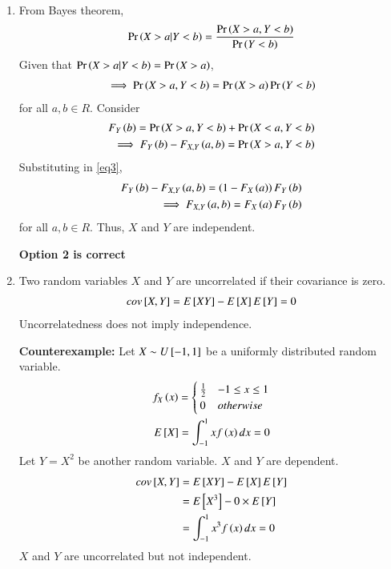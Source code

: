 \documentclass[journal,12pt,twocolumn]{IEEEtran}
\begin{document}
\begin{enumerate}
    \item From Bayes theorem,
    \begin{align}
      \Pr\left(X>a|Y<b\right)=\frac{\Pr\left(X>a,Y<b\right)}{\Pr\left(Y<b\right)}
    \end{align}
    Given that $\Pr\left(X>a|Y<b\right)=\Pr\left(X>a\right)$,
    \begin{align}
        \label{eq3}\implies \Pr\left(X>a,Y<b\right)=\Pr\left(X>a\right)\Pr\left(Y<b\right)
    \end{align}
    for all $a,b\in R$. Consider
    \begin{align}
        F_Y\left(b\right)=\Pr\left(X>a,Y<b\right)+\Pr\left(X<a,Y<b\right)\\
        \implies F_Y\left(b\right)-F_{X,Y}\left(a,b\right)=\Pr\left(X>a,Y<b\right)
    \end{align}
    Substituting in \eqref{eq3},
    \begin{align}
        F_Y\left(b\right)-F_{X,Y}\left(a,b\right)=\left(1-F_X\left(a\right)\right)F_Y\left(b\right)\\
        \implies F_{X,Y}\left(a,b\right)=F_X\left(a\right)F_Y\left(b\right)
    \end{align}
    for all $a,b\in R$. Thus, $X$ and $Y$ are independent. 
    
    \textbf{Option 2 is correct}
    
    \item Two random variables $X$ and $Y$ are uncorrelated if their covariance is zero.
    \begin{align}
        cov{}\left[X,Y\right]=E{}\left[XY\right]-E{}\left[X\right]E{}\left[Y\right]=0
    \end{align}
    Uncorrelatedness does not imply independence.
    
    \textbf{Counterexample:} Let $X\sim U {}\left[-1,1\right]$ be a uniformly distributed random variable.
    \begin{align}
        f_X\left(x\right)=
        \begin{cases}
        \frac{1}{2} & -1\leq x \leq 1\\
        0 & otherwise
        \end{cases}\\
        E{}\left[X\right]=\int_{-1}^{1}x f\left(x\right) dx=0
    \end{align}
    Let $Y=X^2$ be another random variable.
    $X$ and $Y$ are dependent.
    \begin{align}
        cov{}\left[X,Y\right]&=E{}\left[XY\right]-E{}\left[X\right]E{}\left[Y\right]\\
        &=E{}\left[X^3\right]-0\times E{}\left[Y\right]\\
        &=\int_{-1}^{1}x^3 f\left(x\right) dx=0
    \end{align}
    $X$ and $Y$ are uncorrelated but not independent.
    

\end{enumerate}
\end{document}
